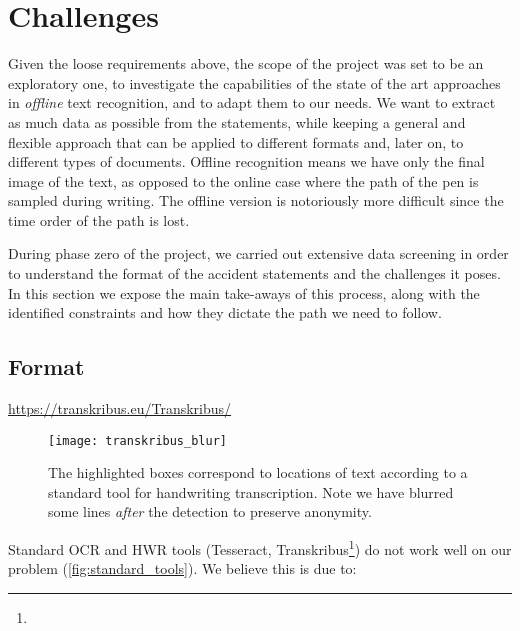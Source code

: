 \section{Challenges}\label{sec:challenges}

Given the loose requirements above, the scope of the project was set to be an exploratory one, to investigate the capabilities of the state of the art approaches in \emph{offline} text recognition, and to adapt them to our needs. We want to extract as much data as possible from the statements, while keeping a general and flexible approach that can be applied to different formats and, later on, to different types of documents. Offline recognition means we have only the final image of the text, as opposed to the online case where the path of the pen is sampled during writing. The offline version is notoriously more difficult since the time order of the path is lost.

During phase zero of the project, we carried out extensive data screening in order to understand the format of the accident statements and the challenges it poses. In this section we expose the main take-aways of this process, along with the identified constraints and how they dictate the path we need to follow.


\subsection{Format}
	\urldef{\transkribus}\url{https://transkribus.eu/Transkribus/}
	\begin{figure}
		\texttt{[image: transkribus\_blur]}
		\caption[Transkribus page segmentation]{The highlighted boxes correspond to locations of text according to a standard tool for handwriting transcription. Note we have blurred some lines \emph{after} the detection to preserve anonymity.}\label{fig:standard_tools}
	\end{figure}
	Standard OCR and HWR tools (Tesseract, Transkribus\footnote{\transkribus}) do not work well on our problem (\autoref{fig:standard_tools}). We believe this is due to:

